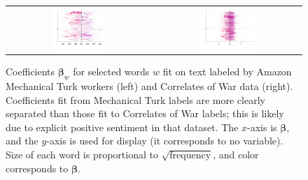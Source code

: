\begin{figure}
  \begin{tabular}{cc}
    \includegraphics[width=0.4\textwidth]{chapter_foreign_relations/figures/mturk_sample_words.pdf} &
    \includegraphics[width=0.4\textwidth]{chapter_foreign_relations/figures/cow_sample_words.pdf} \\
    \end{tabular}
  \caption{Coefficients $\bm \beta_w$ for selected words $w$ fit on text
    labeled by Amazon Mechanical Turk workers (left) and Correlates of
    War data (right). Coefficients fit from Mechanical Turk labels are
    more clearly separated than those fit to Correlates of War labels;
    this is likely due to explicit positive sentiment in that dataset.
    The $x$-axis is $\bm \beta$, and the $y$-axis is used for display (it
    corresponds to no variable).  Size of each word is proportional to
    $\sqrt{\mbox{frequency}}$, and color corresponds to $\bm \beta$.}
  \label{fig:fr_example_betas}
\end{figure}

